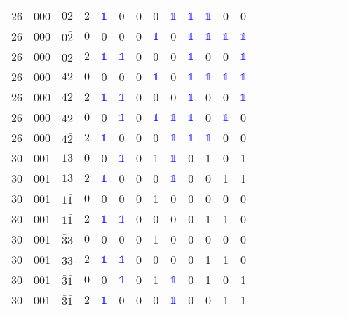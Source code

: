 \begin{longtable*}{c| cccccccccccccccccccc }
26& 000& $02$& $2$& \textcolor{blue}{$\mathds{1}$}& 0& 0& 0& \textcolor{blue}{$\mathds{1}$}& \textcolor{blue}{$\mathds{1}$}& \textcolor{blue}{$\mathds{1}$}& 0& 0\\
26& 000& $0\bar{2}$& $0$& 0& 0& 0& \textcolor{blue}{$\mathds{1}$}& 0& \textcolor{blue}{$\mathds{1}$}& \textcolor{blue}{$\mathds{1}$}& \textcolor{blue}{$\mathds{1}$}& \textcolor{blue}{$\mathds{1}$}\\
26& 000& $0\bar{2}$& $2$& \textcolor{blue}{$\mathds{1}$}& \textcolor{blue}{$\mathds{1}$}& 0& 0& 0& \textcolor{blue}{$\mathds{1}$}& 0& 0& \textcolor{blue}{$\mathds{1}$}\\
26& 000& $42$& $0$& 0& 0& 0& \textcolor{blue}{$\mathds{1}$}& 0& \textcolor{blue}{$\mathds{1}$}& \textcolor{blue}{$\mathds{1}$}& \textcolor{blue}{$\mathds{1}$}& \textcolor{blue}{$\mathds{1}$}\\
26& 000& $42$& $2$& \textcolor{blue}{$\mathds{1}$}& \textcolor{blue}{$\mathds{1}$}& 0& 0& 0& \textcolor{blue}{$\mathds{1}$}& 0& 0& \textcolor{blue}{$\mathds{1}$}\\
26& 000& $4\bar{2}$& $0$& 0& \textcolor{blue}{$\mathds{1}$}& 0& \textcolor{blue}{$\mathds{1}$}& \textcolor{blue}{$\mathds{1}$}& \textcolor{blue}{$\mathds{1}$}& 0& \textcolor{blue}{$\mathds{1}$}& 0\\
26& 000& $4\bar{2}$& $2$& \textcolor{blue}{$\mathds{1}$}& 0& 0& 0& \textcolor{blue}{$\mathds{1}$}& \textcolor{blue}{$\mathds{1}$}& \textcolor{blue}{$\mathds{1}$}& 0& 0\\
30& 001& $13$& $0$& 0& \textcolor{blue}{$\mathds{1}$}& 0& 1& \textcolor{blue}{$\mathds{1}$}& 0& 1& 0& 1\\
30& 001& $13$& $2$& \textcolor{blue}{$\mathds{1}$}& 0& 0& 0& \textcolor{blue}{$\mathds{1}$}& 0& 0& 1& 1\\
30& 001& $1\bar{1}$& $0$& 0& 0& 0& 1& 0& 0& 0& 0& 0\\
30& 001& $1\bar{1}$& $2$& \textcolor{blue}{$\mathds{1}$}& \textcolor{blue}{$\mathds{1}$}& 0& 0& 0& 0& 1& 1& 0\\
30& 001& $\bar{3}3$& $0$& 0& 0& 0& 1& 0& 0& 0& 0& 0\\
30& 001& $\bar{3}3$& $2$& \textcolor{blue}{$\mathds{1}$}& \textcolor{blue}{$\mathds{1}$}& 0& 0& 0& 0& 1& 1& 0\\
30& 001& $\bar{3}\bar{1}$& $0$& 0& \textcolor{blue}{$\mathds{1}$}& 0& 1& \textcolor{blue}{$\mathds{1}$}& 0& 1& 0& 1\\
30& 001& $\bar{3}\bar{1}$& $2$& \textcolor{blue}{$\mathds{1}$}& 0& 0& 0& \textcolor{blue}{$\mathds{1}$}& 0& 0& 1& 1\\

\end{longtable*}
